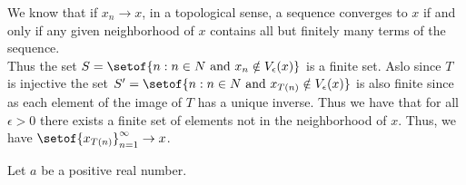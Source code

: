 \documentclass[answers,12pt,addpoints]{exam}
\begin{document}
\begin{questions}
\begin{solution}
            We know that if $x_n \to x$, in a topological sense, a sequence converges to $x$ if and only if any given neighborhood of $x$ contains all but finitely many terms of the sequence. \\
            Thus the set $S = \setof{n: n \in N \text{ and } x_n \notin V_{\epsilon}(x)}$ is a finite set. Aslo since $T$ is injective the set $S' = \setof{n: n \in N \text{ and } x_{T(n)} \notin V_{\epsilon}(x)}$ is also finite since as each element of the image of $T$ has a unique inverse. Thus we have that for all $\epsilon > 0$ there exists a finite set of elements not in the neighborhood of $x$. Thus, we have $\setof{x_{T(n)}}_{n=1}^{\infty} \to x$.
        \end{solution}
        \question Let $a$ be a positive real number.
\end{questions}
\end{document}

